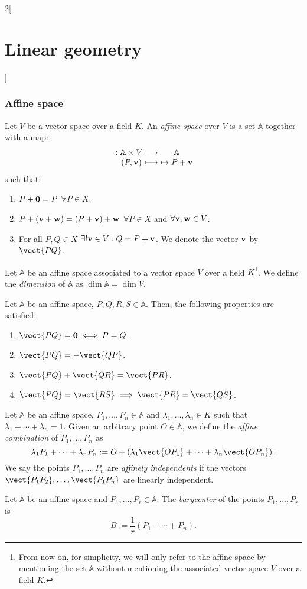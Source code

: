 \documentclass[../../../main.tex]{subfiles}
\begin{document}
\begin{multicols}{2}[\section{Linear geometry}]
  \subsubsection{Affine space}
  \begin{definition}
    Let $V$ be a vector space over a field $K$. An \emph{affine space} over $V$ is a set $\mathbb{A}$ together with a map:
    $$\function{}{\mathbb{A}\times V}{\mathbb{A}}{(P,\vf{v})}{\mapsto P+\vf{v}}$$
    such that:
    \begin{enumerate}
      \item $P+\boldsymbol{\mathrm{0}}=P$ $\forall P\in X$.
      \item $P+(\boldsymbol{\mathrm{v}}+\boldsymbol{\mathrm{w}})=(P+\boldsymbol{\mathrm{v}})+\boldsymbol{\mathrm{w}}$ $\forall P\in X$ and $\forall\boldsymbol{\mathrm{v}},\boldsymbol{\mathrm{w}}\in V$.
      \item For all $P,Q\in X$ $\exists!\boldsymbol{\mathrm{v}}\in V:Q=P+\boldsymbol{\mathrm{v}}$. We denote the vector $\boldsymbol{\mathrm{v}}$ by $\vect{PQ}$.
    \end{enumerate}
  \end{definition}
  \begin{definition}
    Let $\mathbb{A}$ be an affine space associated to a vector space $V$ over a field $K$\footnote{From now on, for simplicity, we will only refer to the affine space by mentioning the set $\mathbb{A}$ without mentioning the associated vector space $V$ over a field $K$.}. We define the \emph{dimension} of $\mathbb{A}$ as $\dim\mathbb{A}=\dim V$.
  \end{definition}
  \begin{proposition}
    Let $\mathbb{A}$ be an affine space, $P,Q,R,S\in\mathbb{A}$. Then, the following properties are satisfied:
    \begin{enumerate}
      \item $\vect{PQ}=\vf{0}\iff P=Q$.
      \item $\vect{PQ}=-\vect{QP}$.
      \item $\vect{PQ}+\vect{QR}=\vect{PR}$.
      \item $\vect{PQ}=\vect{RS}\implies\vect{PR}=\vect{QS}$.
    \end{enumerate}
  \end{proposition}
  \begin{definition}
    Let $\mathbb{A}$ be an affine space, $P_1,\ldots,P_n\in\mathbb{A}$ and $\lambda_1,\ldots,\lambda_n\in K$ such that $\lambda_1+\cdots+\lambda_n=1$. Given an arbitrary point $O\in\mathbb{A}$, we define the \emph{affine combination} of $P_1,\ldots,P_n$ as $$\lambda_1P_1+\cdots+\lambda_nP_n:=O+\left(\lambda_1\vect{OP_1}+\cdots+\lambda_n\vect{OP_n}\right).$$ We say the points $P_1,\ldots,P_n$ are \emph{affinely independents} if the vectors $\vect{P_1P_2},\ldots,\vect{P_1P_n}$ are linearly independent.
  \end{definition}
  \begin{definition}
    Let $\mathbb{A}$ be an affine space and $P_1,\ldots,P_r\in\mathbb{A}$. The \emph{barycenter} of the points $P_1,\ldots,P_r$ is $$B:=\frac{1}{r}\left(P_1+\cdots+P_n\right).$$
  \end{definition}

\end{multicols}
\end{document}
